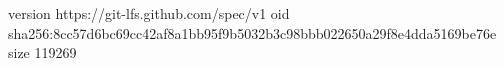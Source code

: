 version https://git-lfs.github.com/spec/v1
oid sha256:8cc57d6bc69cc42af8a1bb95f9b5032b3c98bbb022650a29f8e4dda5169be76e
size 119269
